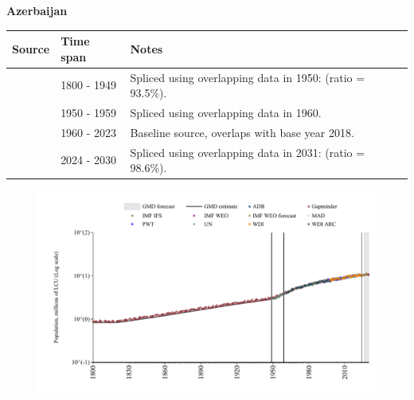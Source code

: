 \documentclass[12pt,a4paper,landscape]{article}
\begin{document}
\begin{adjustbox}{max totalsize={\paperwidth}{\paperheight},center}
\begin{minipage}[t][\textheight][t]{\textwidth}
\vspace*{0.5cm}
{}
\begin{center}
{\Large\bfseries Azerbaijan}
\end{center}
\vspace{0.5cm}
\begin{table}[H]
\centering
\small
\begin{tabular}{|l|l|l|}
\hline
\textbf{Source} & \textbf{Time span} & \textbf{Notes} \\
\hline
\rowcolor{white}\cite{Gapminder}& 1800 - 1949 &Spliced using overlapping data in 1950: (ratio = 93.5\%).\\
\rowcolor{lightgray}\cite{IMF_IFS}& 1950 - 1959 &Spliced using overlapping data in 1960.\\
\rowcolor{white}\cite{WDI}& 1960 - 2023 &Baseline source, overlaps with base year 2018.\\
\rowcolor{lightgray}\cite{Gapminder}& 2024 - 2030 &Spliced using overlapping data in 2031: (ratio = 98.6\%).\\
\hline
\end{tabular}
\end{table}
\begin{figure}[H]
\centering
\includegraphics[width=\textwidth,height=0.6\textheight,keepaspectratio]{graphs/AZE_pop.pdf}
\end{figure}
\end{minipage}
\end{adjustbox}
\end{document}
